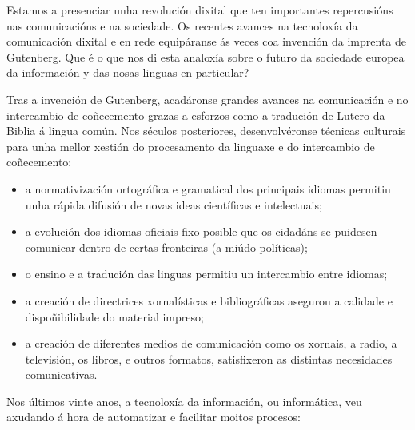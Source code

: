 \begin{multicols}{2}

 Estamos a presenciar  unha revolución dixital que ten importantes repercusións nas comunicacións e na sociedade. Os recentes avances na tecnoloxía da comunicación dixital e en rede equipáranse ás veces coa invención da imprenta de Gutenberg.  Que é o que nos di esta analoxía sobre o futuro da sociedade europea da información y das nosas linguas en particular?


Tras a invención de Gutenberg, acadáronse grandes avances na comunicación e no intercambio de coñecemento grazas a esforzos como a tradución de Lutero da Biblia á lingua común. Nos séculos posteriores, desenvolvéronse técnicas culturais para unha mellor xestión do procesamento da linguaxe e do intercambio de coñecemento:

\begin{itemize}
\item a normativización ortográfica e gramatical dos principais idiomas permitiu unha rápida difusión de novas ideas científicas e intelectuais;
\item a evolución dos idiomas oficiais fixo posible que os cidadáns se puidesen comunicar dentro de certas fronteiras (a miúdo políticas);
\item o ensino e a tradución das linguas permitiu un intercambio entre idiomas;
\item a creación de directrices xornalísticas e bibliográficas asegurou a calidade e dispoñibilidade do material impreso;
\item a creación de diferentes medios de comunicación como os xornais, a radio, a televisión, os libros, e outros formatos, satisfixeron as distintas necesidades comunicativas. 
\end{itemize}

Nos últimos vinte anos, a tecnoloxía da información, ou informática, veu axudando á hora de automatizar e facilitar moitos procesos:


\end{multicols}

